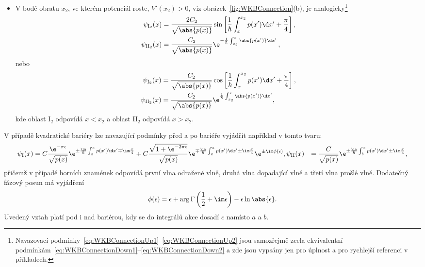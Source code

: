 \begin{itemize}
\item
    V bodě obratu $x_{2}$, ve kterém potenciál roste, $V'(x_{2})>0$, viz obrázek~\ref{fig:WKBConnection}(b), je analogicky\footnote{
        Navazovací podmínky~\eqref{eq:WKBConnectionUp1}--\eqref{eq:WKBConnectionUp2} jsou samozřejmě zcela ekvivalentní podmínkám~\eqref{eq:WKBConnectionDown1}--\eqref{eq:WKBConnectionDown2} a zde jsou vypsány jen pro úplnost a pro rychlejší referenci v příkladech.
    }
    \begin{subequations}
        \begin{align}
            \psi_{\mathrm{I}_{2}}(x)&=\frac{2C_{2}}{\sqrt{\abs{p(x)}}}\sin\left[\frac{1}{\hbar}\int_{x}^{x_{2}}p(x')\d x'+\frac{\pi}{4}\right],\\
            \psi_{\mathrm{II}_{2}}(x)&=\frac{C_{2}}{\sqrt{\abs{p(x)}}}\e^{-\frac{1}{\hbar}\int_{x_{2}}^{x}\abs{p(x')}\d x'}\,,
        \end{align}            
        \label{eq:WKBConnectionUp1}
    \end{subequations}
    nebo
    \begin{subequations}
        \begin{align}
            \psi_{\mathrm{I}_{2}}(x)&=\frac{C_{2}}{\sqrt{\abs{p(x)}}}\cos\left[\frac{1}{\hbar}\int_{x}^{x_{2}}p(x')\d x'+\frac{\pi}{4}\right],\\
            \psi_{\mathrm{II}_{2}}(x)&=\frac{C_{2}}{\sqrt{\abs{p(x)}}}\e^{\frac{1}{\hbar}\int_{x_{2}}^{x}\abs{p(x')}\d x'},
        \end{align}            
        \label{eq:WKBConnectionUp2}
    \end{subequations}
    kde oblast I$_{2}$ odpovídá $x<x_{2}$ a oblast II$_{2}$ odpovídá $x>x_{2}$.
\end{itemize}

	V případě kvadratické bariéry lze navazující podmínky před a po bariéře vyjádřit například v tomto tvaru:
    \begin{subequations}
        \begin{align}
            \psi_{\mathrm{I}}(x)
                &=C\frac{\e^{-\pi\epsilon}}{\sqrt{p(x)}}
                \e^{\pm\frac{\im}{\hbar}\int_{x}^{a}p(x')\d x'\mp\im\frac{\pi}{4}}
                +C\frac{\sqrt{1+\e^{-2\pi\epsilon}}}{\sqrt{p(x)}}
                \e^{\mp\frac{\im}{\hbar}\int_{x}^{a}p(x')\d x'\pm\im\frac{\pi}{4}}\e^{\pm\im\phi(\epsilon)},
            \psi_{\mathrm{II}}(x)
                &=\frac{C}{\sqrt{p(x)}}
                \e^{\pm\frac{\im}{\hbar}\int_{b}^{x}p(x')\d x'\pm\im\frac{\pi}{4}},
        \end{align}            
    \end{subequations}
	přičemž v případě horních znamének odpovídá první vlna odražené vlně, druhá vlna dopadající vlně a třetí vlna prošlé vlně.
	Dodatečný fázový posun má vyjádření
	\begin{equation}
		\phi(\epsilon)=\epsilon+\arg\Gamma\left(\frac{1}{2}+\im\epsilon\right)-\epsilon\ln\abs{\epsilon}.
	\end{equation}
	Uvedený vztah platí pod i nad bariérou, kdy se do integrálů akce dosadí $c$ namísto $a$ a $b$.
    